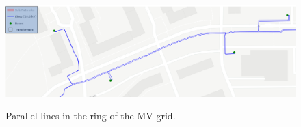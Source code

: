 \begin{figure}[h]
	\begin{centering}
		{\includegraphics[scale=0.5]{figures/experiments/enwg_zoom.png}}
		\caption{Parallel lines in the ring of the MV grid.}
		\label{fig:enwg_zoom}
	\end{centering}
\end{figure}
